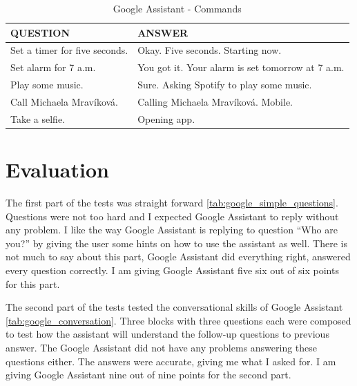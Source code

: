 \documentclass[
  digital, %
  oneside, %
  table,   %
  lof,     %
  lot,     %
]{fithesis3}
\begin{document}
\begin{table}[H]
    \begin{tabular}{ | p{6cm} | p{6cm} |} 
    \hline
    QUESTION & ANSWER \\
    \hline
    Set a timer for five seconds.
    & 
    Okay.
    \newline
    Five seconds.
    \newline
    Starting now.
    \\
    \hline
    Set alarm for 7 a.m.
    &
    You got it. 
    \newline
    Your alarm is set tomorrow at 7 a.m.
    \\
    \hline
    Play some music.
    &
    Sure. 
    \newline
    Asking Spotify to play some music.
    \\
    \hline
    Call Michaela Mravíková.
    &
    Calling Michaela Mravíková.
    \newline
    Mobile.
    \\
    \hline
    Take a selfie.
    &
    Opening app.
    \\
    \hline
    \end{tabular}
    \caption{Google Assistant - Commands}
    \label{tab:google_commands}
\end{table}

\section{Evaluation}

The first part of the tests was straight forward \ref{tab:google_simple_questions}. Questions were not too hard and I expected Google Assistant to reply without any problem. I like the way Google Assistant is replying to question ``Who are you?'' by giving the user some hints on how to use the assistant as well. There is not much to say about this part, Google Assistant did everything right, answered every question correctly. I am giving Google Assistant five six out of six points for this part.

The second part of the tests tested the conversational skills of Google Assistant \ref{tab:google_conversation}. Three blocks with three questions each were composed to test how the assistant will understand the follow-up questions to previous answer. The Google Assistant did not have any problems answering these questions either. The answers were accurate, giving me what I asked for. I am giving Google Assistant nine out of nine points for the second part.
\end{document}
